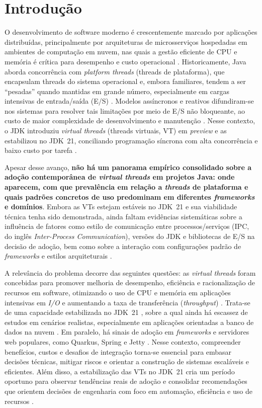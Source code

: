\section{Introdução}
\label{sec:introducao}
O desenvolvimento de software moderno é crescentemente marcado por aplicações distribuídas, principalmente por arquiteturas de microsserviços hospedadas em ambientes de computação em nuvem, nas quais a gestão eficiente de CPU e memória é crítica para desempenho e custo operacional \cite{mohamed:21}. Historicamente, Java aborda concorrência com \textit{platform threads} (threads de plataforma), que encapsulam threads do sistema operacional e, embora familiares, tendem a ser “pesadas” quando mantidas em grande número, especialmente em cargas intensivas de entrada/saída (E/S) \cite{navarro:23, lasic:24}. Modelos assíncronos e reativos difundiram-se nos sistemas para resolver tais limitações por meio de E/S não bloqueante, ao custo de maior complexidade de desenvolvimento e manutenção \cite{navarro:23}. Nesse contexto, o JDK introduziu \textit{virtual threads} (threads virtuais, VT) em \textit{preview} e as estabilizou no JDK~21, conciliando programação síncrona com alta concorrência e baixo custo por tarefa \cite{jep444}.

Apesar desse avanço, \textbf{não há um panorama empírico consolidado sobre a adoção contemporânea de \textit{virtual threads} em projetos Java: onde aparecem, com que prevalência em relação a \textit{threads} de plataforma e quais padrões concretos de uso predominam em diferentes \textit{frameworks} e domínios}. Embora as VTs estejam estáveis no JDK~21 e sua viabilidade técnica tenha sido demonstrada, ainda faltam evidências sistemáticas sobre a influência de fatores como estilo de comunicação entre processos/serviços (IPC, do inglês \textit{Inter-Process Communication}), versões do JDK e bibliotecas de E/S na decisão de adoção, bem como sobre a interação com configurações padrão de \textit{frameworks} e estilos arquiteturais \cite{mohamed:21,navarro:23}.

A relevância do problema decorre das seguintes questões: as \textit{virtual threads} foram concebidas para promover melhoria de desempenho, eficiência e racionalização de recursos em software, otimizando o uso de CPU e memória em aplicações intensivas em \textit{I/O} e aumentando a taxa de transferência (\textit{throughput}) \cite{navarro:23}. Trata-se de uma capacidade estabilizada no JDK~21 \cite{jep444}, sobre a qual ainda há escassez de estudos em cenários realistas, especialmente em aplicações orientadas a banco de dados na nuvem \cite{lasic:24}. Em paralelo, há sinais de adoção em \textit{frameworks} e servidores web populares, como Quarkus, Spring e Jetty \cite{rosa:23}. Nesse contexto, compreender benefícios, custos e desafios de integração torna-se essencial para embasar decisões técnicas, mitigar riscos e orientar a construção de sistemas escaláveis e eficientes. Além disso, a estabilização das VTs no JDK~21 cria um período oportuno para observar tendências reais de adoção e consolidar recomendações que orientem decisões de engenharia com foco em automação, eficiência e uso de recursos \cite{jep444}.

